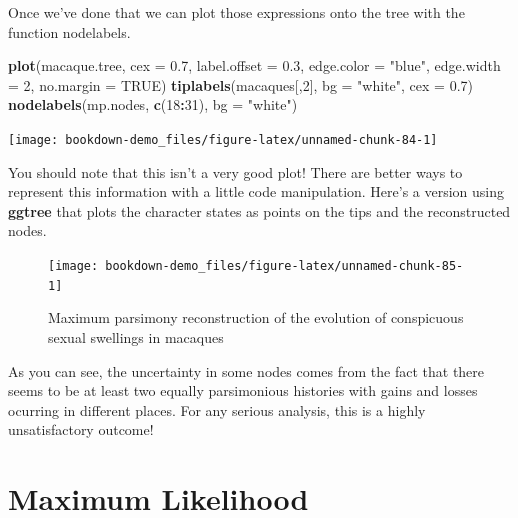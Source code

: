 \documentclass[
]{book}
\newenvironment{Shaded}{\begin{snugshade}}{\end{snugshade}}
\newcommand{\DataTypeTok}[1]{\textcolor[rgb]{0.13,0.29,0.53}{#1}}
\newcommand{\DecValTok}[1]{\textcolor[rgb]{0.00,0.00,0.81}{#1}}
\newcommand{\FloatTok}[1]{\textcolor[rgb]{0.00,0.00,0.81}{#1}}
\newcommand{\KeywordTok}[1]{\textcolor[rgb]{0.13,0.29,0.53}{\textbf{#1}}}
\newcommand{\NormalTok}[1]{#1}
\newcommand{\OperatorTok}[1]{\textcolor[rgb]{0.81,0.36,0.00}{\textbf{#1}}}
\newcommand{\OtherTok}[1]{\textcolor[rgb]{0.56,0.35,0.01}{#1}}
\newcommand{\StringTok}[1]{\textcolor[rgb]{0.31,0.60,0.02}{#1}}
\begin{document}
Once we've done that we can plot those expressions onto the tree with the function nodelabels.

\begin{Shaded}
\begin{Highlighting}[]
\KeywordTok{plot}\NormalTok{(macaque.tree, }\DataTypeTok{cex =} \FloatTok{0.7}\NormalTok{, }\DataTypeTok{label.offset =} \FloatTok{0.3}\NormalTok{,}
     \DataTypeTok{edge.color =} \StringTok{"blue"}\NormalTok{, }\DataTypeTok{edge.width =} \DecValTok{2}\NormalTok{, }\DataTypeTok{no.margin =} \OtherTok{TRUE}\NormalTok{)      }
\KeywordTok{tiplabels}\NormalTok{(macaques[,}\DecValTok{2}\NormalTok{], }\DataTypeTok{bg =} \StringTok{"white"}\NormalTok{, }\DataTypeTok{cex =} \FloatTok{0.7}\NormalTok{)}
\KeywordTok{nodelabels}\NormalTok{(mp.nodes, }\KeywordTok{c}\NormalTok{(}\DecValTok{18}\OperatorTok{:}\DecValTok{31}\NormalTok{), }\DataTypeTok{bg =} \StringTok{"white"}\NormalTok{)}
\end{Highlighting}
\end{Shaded}

\begin{center}\texttt{[image: bookdown-demo\_files/figure-latex/unnamed-chunk-84-1]} \end{center}

You should note that this isn't a very good plot! There are better ways to represent this information with a little code manipulation. Here's a version using \textbf{ggtree} that plots the character states as points on the tips and the reconstructed nodes.

\begin{figure}[H]

{\centering \texttt{[image: bookdown-demo\_files/figure-latex/unnamed-chunk-85-1]} 

}

\caption{Maximum parsimony reconstruction of the evolution of conspicuous sexual swellings in macaques}\label{fig:unnamed-chunk-85}
\end{figure}

As you can see, the uncertainty in some nodes comes from the fact that there seems to be at least two equally parsimonious histories with gains and losses ocurring in different places. For any serious analysis, this is a highly unsatisfactory outcome!

\hypertarget{maximum-likelihood}{%
\section{Maximum Likelihood}\label{maximum-likelihood}}
\end{document}
